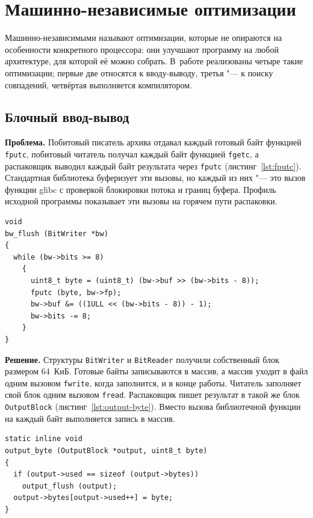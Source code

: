 \chapter{Машинно-независимые оптимизации}

Машинно-независимыми называют оптимизации, которые не опираются на
особенности конкретного процессора: они улучшают программу на любой
архитектуре, для которой её можно собрать. В~работе
реализованы четыре такие оптимизации; первые две относятся к
вводу-выводу, третья "--- к поиску совпадений, четвёртая выполняется
компилятором.

\section{Блочный ввод-вывод}
\label{sec:block-io}

\textbf{Проблема.} Побитовый писатель архива отдавал каждый готовый байт
функцией \texttt{fputc}, побитовый читатель получал каждый байт функцией
\texttt{fgetc}, а распаковщик выводил каждый байт результата через
\texttt{fputc} (листинг~\ref{lst:fputc}). Стандартная библиотека
буферизует эти вызовы, но каждый из них "--- это вызов функции glibc с
проверкой блокировки потока и границ буфера. Профиль исходной программы
показывает эти вызовы на горячем пути распаковки.

\begin{lstlisting}[caption={Вывод байт архива в исходной программе},label={lst:fputc}]
void
bw_flush (BitWriter *bw)
{
  while (bw->bits >= 8)
    {
      uint8_t byte = (uint8_t) (bw->buf >> (bw->bits - 8));
      fputc (byte, bw->fp);
      bw->buf &= ((1ULL << (bw->bits - 8)) - 1);
      bw->bits -= 8;
    }
}
\end{lstlisting}

\textbf{Решение.} Структуры \texttt{BitWriter} и \texttt{BitReader} получили
собственный блок размером 64~КиБ. Готовые байты записываются в массив, а
массив уходит в файл одним вызовом \texttt{fwrite}, когда заполнится, и в
конце работы. Читатель заполняет свой блок одним вызовом \texttt{fread}.
Распаковщик пишет результат в такой же блок \texttt{OutputBlock}
(листинг~\ref{lst:output-byte}). Вместо вызова библиотечной функции на
каждый байт выполняется запись в массив.

\begin{lstlisting}[caption={Вывод байта распакованных данных через блок},label={lst:output-byte}]
static inline void
output_byte (OutputBlock *output, uint8_t byte)
{
  if (output->used == sizeof (output->bytes))
    output_flush (output);
  output->bytes[output->used++] = byte;
}
\end{lstlisting}

